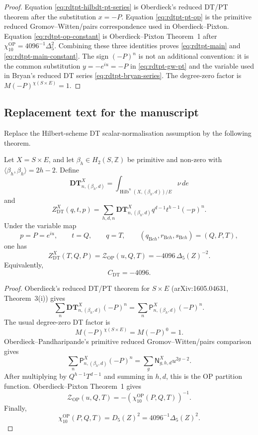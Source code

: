 \begin{proof}
Equation \eqref{eq:rdtpt-hilbdt-pt-series} is Oberdieck's reduced
DT/PT theorem after the substitution \(x=-P\).  Equation
\eqref{eq:rdtpt-pt-op} is the primitive reduced
Gromov--Witten/pairs correspondence used in Oberdieck--Pixton.  Equation
\eqref{eq:rdtpt-op-constant} is Oberdieck--Pixton Theorem~1 after
\(\chi_{10}^{\mathrm{OP}}=4096^{-1}\Delta_5^2\).  Combining these three
identities proves \eqref{eq:rdtpt-main} and
\eqref{eq:rdtpt-main-constant}.  The sign \((-P)^n\) is not an
additional convention: it is the common substitution \(y=-e^{iu}=-P\)
in \eqref{eq:rdtpt-gw-pt} and the variable used in Bryan's reduced DT
series \eqref{eq:rdtpt-bryan-series}.  The degree-zero factor is
\(M(-P)^{\chi(S\times E)}=1\).
\end{proof}

\subsection{Replacement text for the manuscript}

Replace the Hilbert-scheme DT scalar-normalisation assumption by the
following theorem.

\begin{theorem}
\label{thm:hilb-dt-op-square-replacement}
Let \(X=S\times E\), and let
\(\beta_h\in H_2(S,\mathbb Z)\) be primitive and non-zero with
\(\langle\beta_h,\beta_h\rangle=2h-2\).  Define
\[
\mathbf{DT}^X_{n,(\beta_h,d)}
=
\int_{\operatorname{Hilb}^n(X,(\beta_h,d))/E}\nu\,de
\]
and
\[
Z^X_{\mathrm{DT}}(q,t,p)
=
\sum_{h,d,n}\mathbf{DT}^X_{n,(\beta_h,d)}
q^{d-1}t^{h-1}(-p)^n.
\]
Under the variable map
\[
p=P=e^{iu},\qquad t=Q,\qquad q=T,
\qquad
(q_{\mathrm Bch},r_{\mathrm Bch},s_{\mathrm Bch})=(Q,P,T),
\]
one has
\[
Z^X_{\mathrm{DT}}(T,Q,P)
=
\mathcal Z_{\mathrm{OP}}(u,Q,T)
=
-4096\,\Delta_5(Z)^{-2}.
\]
Equivalently,
\[
C_{\mathrm{DT}}=-4096.
\]
\end{theorem}

\begin{proof}
Oberdieck's reduced DT/PT theorem for \(S\times E\)
(arXiv:1605.04631, Theorem~3(i)) gives
\[
\sum_n\mathbf{DT}^X_{n,(\beta_h,d)}(-P)^n
=
\sum_n\mathsf P^X_{n,(\beta_h,d)}(-P)^n.
\]
The usual degree-zero DT factor is
\[
M(-P)^{\chi(S\times E)}=M(-P)^0=1.
\]
Oberdieck--Pandharipande's primitive reduced
Gromov--Witten/pairs comparison gives
\[
\sum_n\mathsf P^X_{n,(\beta_h,d)}(-P)^n
=
\sum_g\mathsf N^X_{g,h,d}u^{2g-2}.
\]
After multiplying by \(Q^{h-1}T^{d-1}\) and summing in \(h,d\), this is
the OP partition function.  Oberdieck--Pixton Theorem~1 gives
\[
\mathcal Z_{\mathrm{OP}}(u,Q,T)
=
-\left(\chi_{10}^{\mathrm{OP}}(P,Q,T)\right)^{-1}.
\]
Finally,
\[
\chi_{10}^{\mathrm{OP}}(P,Q,T)=D_5(Z)^2=4096^{-1}\Delta_5(Z)^2.
\]
\end{proof}


